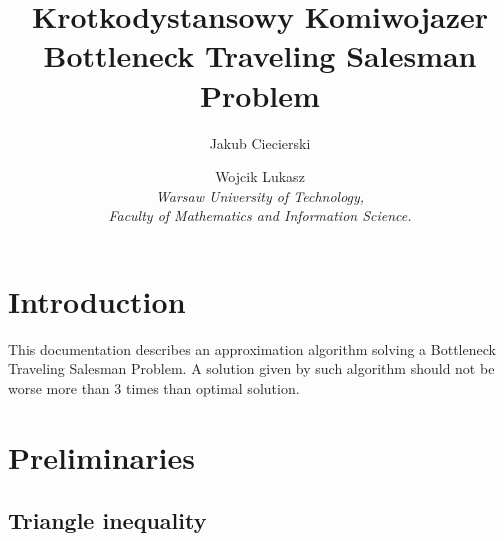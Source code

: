 \documentclass[runningheads, a4paper]{llncs}
\begin{document}
        
        \mainmatter  %
        
        \title{Krotkodystansowy Komiwojazer \\ Bottleneck Traveling Salesman Problem}
        
        
        \author{Jakub Ciecierski \and Wojcik Lukasz \\ 
            \textit{Warsaw University of Technology, \\
                Faculty of Mathematics and Information Science.}}
        
        
        \maketitle
        
        
        
        
        
        \section{Introduction}
        
        This documentation describes an approximation algorithm solving a Bottleneck Traveling Salesman Problem. A solution given by such algorithm should not be worse more than 3 times than optimal solution.
        
        \section{Preliminaries}
        
        \subsection{Triangle inequality}
        
\end{document}
